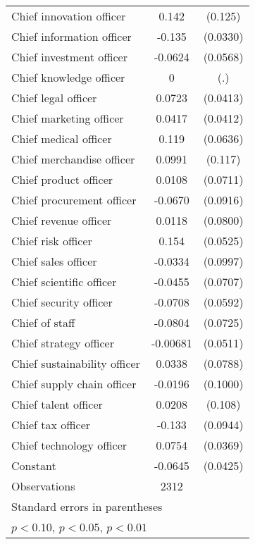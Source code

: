 \begin{table}[htbp]
\begin{tabular}{l*{1}{cc}}
Chief innovation officer&    0.142         &  (0.125)\\
Chief information officer&   -0.135\sym{***}& (0.0330)\\
Chief investment officer&  -0.0624         & (0.0568)\\
Chief knowledge officer&        0         &      (.)\\
Chief legal officer&   0.0723\sym{*}  & (0.0413)\\
Chief marketing officer&   0.0417         & (0.0412)\\
Chief medical officer&    0.119\sym{*}  & (0.0636)\\
Chief merchandise officer&   0.0991         &  (0.117)\\
Chief product officer&   0.0108         & (0.0711)\\
Chief procurement officer&  -0.0670         & (0.0916)\\
Chief revenue officer&   0.0118         & (0.0800)\\
Chief risk officer&    0.154\sym{***}& (0.0525)\\
Chief sales officer&  -0.0334         & (0.0997)\\
Chief scientific officer&  -0.0455         & (0.0707)\\
Chief security officer&  -0.0708         & (0.0592)\\
Chief of staff  &  -0.0804         & (0.0725)\\
Chief strategy officer& -0.00681         & (0.0511)\\
Chief sustainability officer&   0.0338         & (0.0788)\\
Chief supply chain officer&  -0.0196         & (0.1000)\\
Chief talent officer&   0.0208         &  (0.108)\\
Chief tax officer&   -0.133         & (0.0944)\\
Chief technology officer&   0.0754\sym{**} & (0.0369)\\
Constant        &  -0.0645         & (0.0425)\\
\midrule
Observations    &     2312         &         \\
\bottomrule
\multicolumn{3}{l}{\footnotesize Standard errors in parentheses}\\
\multicolumn{3}{l}{\footnotesize \sym{*} \(p<0.10\), \sym{**} \(p<0.05\), \sym{***} \(p<0.01\)}\\
\end{tabular}
\end{table}
